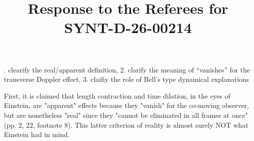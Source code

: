 \documentclass[submitted,11pt]{article}
\title{Response to the Referees for SYNT-D-26-00214}
\begin{document}
. clearify the real/apparent definition, 
2. clarify the meaning of “vanishes” for the transverse Doppler effect, 
3. claifiy the role of Bell's type dynamical explanations


\reviewersection

\reviewersection

\begin{point}
First, it is claimed that length contraction and time dilation, in the eyes of Einstein, are "apparent" effects because they "vanish" for the co-moving observer, but are nonetheless "real" since they "cannot be eliminated in all frames at once" (pp. 2, 22, footnote 8). This latter criterion of reality is almost surely NOT what Einstein had in mind. 
\end{point}
\end{document}

